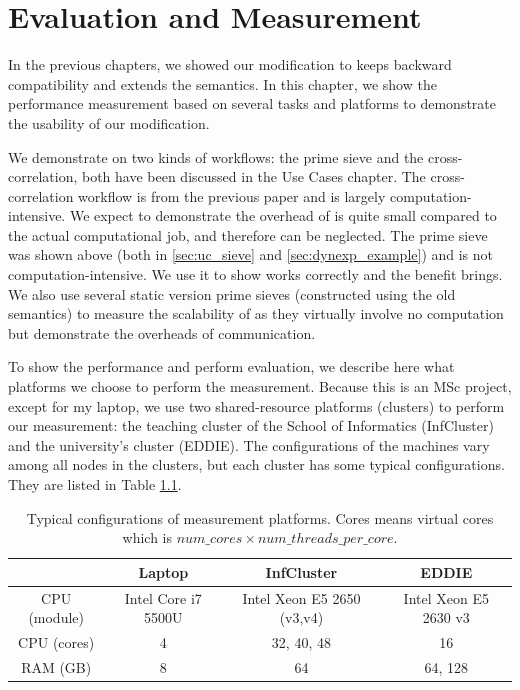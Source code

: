 \chapter{Evaluation and Measurement}
In the previous chapters, we showed our modification to \dpy keeps backward compatibility and extends the semantics. In this chapter, we show the performance measurement based on several tasks and platforms to demonstrate the usability of our modification.

We demonstrate on two kinds of workflows: the prime sieve and the cross-correlation, both have been discussed in the Use Cases chapter. The cross-correlation workflow is from the previous \dpy paper and is largely computation-intensive. We expect to demonstrate the overhead of \tincdep is quite small compared to the actual computational job, and therefore can be neglected. The prime sieve was shown above (both in \ref{sec:uc_sieve} and \ref{sec:dynexp_example}) and is not computation-intensive. We use it to show \tdynexp works correctly and the benefit \tdynexp brings. We also use several static version prime sieves (constructed using the old semantics) to measure the scalability of \tincdep as they virtually involve no computation but demonstrate the overheads of communication.

To show the performance and perform evaluation, we describe here what platforms we choose to perform the measurement. Because this is an MSc project, except for my laptop, we use two shared-resource platforms (clusters) to perform our measurement: the teaching cluster of the School of Informatics (InfCluster) and the university's cluster (EDDIE).
The configurations of the machines vary among all nodes in the clusters, but each cluster has some typical configurations. They are listed in Table \ref{tbl:list_measurement}.

\begin{table}[h]
\centering
\begin{tabular}{|c|c|c|c|}
\hline
 & Laptop & InfCluster & EDDIE \\ \hline
CPU (module) & Intel Core i7 5500U & Intel Xeon E5 2650 (v3,v4) & Intel Xeon E5 2630 v3 \\ \hline
CPU (cores) & 4 & 32, 40, 48 & 16 \\ \hline
RAM (GB) & 8 & 64 & 64, 128 \\ \hline
\end{tabular}
\caption{Typical configurations of measurement platforms. Cores means virtual cores which is $num\_cores \times num\_threads\_per\_core$.}
\label{tbl:list_measurement}
\end{table}

